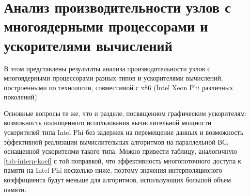 \section{Анализ производительности узлов с многоядерными процессорами и ускорителями вычислений} 
В этом представлены результаты анализа производительности узлов с многоядерными процессорами разных типов и ускорителями вычислений, построенными по технологии, совместимой с x86 (Intel Xeon Phi различных поколений)

Основные вопросы те же, что и разделе, посвященном графическим ускорителям: возможность полноценного использования вычислительной мощности 
ускорителей типа Intel Phi без задержек на перемещение данных и возможность эффективной реализации вычислительных алгоритмов на параллельной ВС, оснащенной ускорителми такого типа. Можно привести таблицу, аналогичную \ref{tab-interp-koef} с той поправкой, что эффективность многопоточного доступа к памяти на Intel Phi несколько ниже, поэтому значения интерполяционого коэффициента будут меньше для алгоритмов, использующих большой объем памяти.
